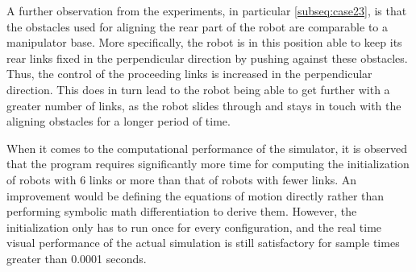 A further observation from the experiments, in particular \ref{subseq:case23}, is that the obstacles used for aligning the rear part of the robot are comparable to a manipulator base. More specifically, the robot is in this position able to keep its rear links fixed in the perpendicular direction by pushing against these obstacles. Thus, the control of the proceeding links is increased in the perpendicular direction.
This does in turn lead to the robot being able to get further with a greater number of links, as the robot slides through and stays in touch with the aligning obstacles for a longer period of time.

When it comes to the computational performance of the simulator, it is observed that the program requires significantly more time for computing the initialization of robots with 6 links or more than that of robots with fewer links. An improvement would be defining the equations of motion directly rather than performing symbolic math differentiation to derive them. However, the initialization only has to run once for every configuration, and the real time visual performance of the actual simulation is still satisfactory for sample times greater than 0.0001 seconds.




